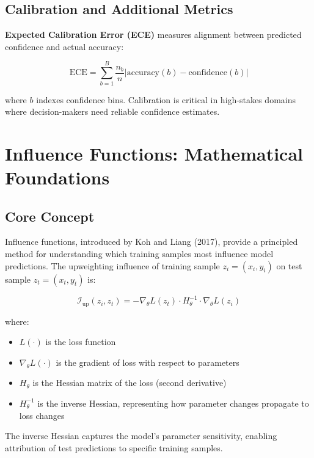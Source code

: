 \documentclass[11pt,a4paper,oneside]{report}
\begin{document}
\subsection{Calibration and Additional Metrics}

\textbf{Expected Calibration Error (ECE)} measures alignment between predicted confidence and actual accuracy:

\begin{equation}
\text{ECE} = \sum_{b=1}^{B} \frac{n_b}{n} \left| \text{accuracy}(b) - \text{confidence}(b) \right|
\end{equation}

where $b$ indexes confidence bins. Calibration is critical in high-stakes domains where decision-makers need reliable confidence estimates.

\section{Influence Functions: Mathematical Foundations}

\subsection{Core Concept}

Influence functions, introduced by Koh and Liang (2017), provide a principled method for understanding which training samples most influence model predictions. The upweighting influence of training sample $z_i = (x_i, y_i)$ on test sample $z_t = (x_t, y_t)$ is:

\begin{equation}
\mathcal{I}_{\text{up}}(z_i, z_t) = -\nabla_{\theta} L(z_t) \cdot H_{\theta}^{-1} \cdot \nabla_{\theta} L(z_i)
\end{equation}

where:
\begin{itemize}
\item $L(\cdot)$ is the loss function
\item $\nabla_{\theta} L(\cdot)$ is the gradient of loss with respect to parameters
\item $H_{\theta}$ is the Hessian matrix of the loss (second derivative)
\item $H_{\theta}^{-1}$ is the inverse Hessian, representing how parameter changes propagate to loss changes
\end{itemize}

The inverse Hessian captures the model's parameter sensitivity, enabling attribution of test predictions to specific training samples.
\end{document}

